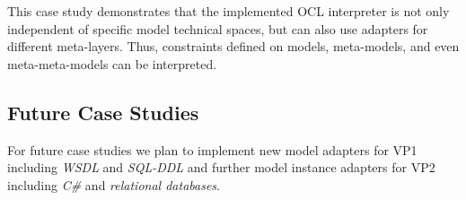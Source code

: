 This case study demonstrates that the implemented OCL interpreter is not only independent
of specific model technical spaces, but can also use adap\-ters for different meta-layers.
Thus, constraints defined on models, meta-models, and even meta-meta-models can be interpreted.



\subsection{Future Case Studies}

For future case studies we plan to implement new model adapters for VP1
including \emph{WSDL} and \emph{SQL-DDL} and further model instance adapters for 
VP2 including \emph{C\#} and \emph{relational databases}.

